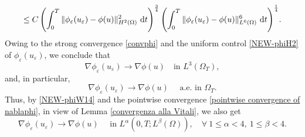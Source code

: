 \documentclass[11pt,  reqno]{amsart}%
\theoremstyle{plain}
\theoremstyle{definition}
\theoremstyle{remark}
\numberwithin{equation}{section}
\newcommand{\ve}{\varepsilon}
\newcommand{\dt}{\textup{d}t}
\begin{document}
\begin{itemize}
\begin{align*}
        \leq 
        C\left( \int_0^T\|\phi_\ve(u_\ve)-\phi(u)\|^{2}_{H^2(\Omega)}\ \dt\right)^{\frac34} 
        \left( \int_0^T\|\phi_\ve(u_\ve)-\phi(u)\|^{6}_{L^6(\Omega)}\ \dt\right)^{\frac14}\!.
    \end{align*}
  Owing to the strong convergence \eqref{convphi} and the uniform control \eqref{NEW-phiH2} of $\phi_\ve(u_\ve)$, we conclude that
    \begin{equation}
        \label{conv5}
        \nabla \phi_{\ve}(u_{\ve}) \to \nabla\phi(u) \quad \mbox{in } L^3(\Omega_T),
    \end{equation}
    and, in particular, 
    \begin{equation}
        \label{pointwise convergence of nablaphi}
        \nabla \phi_\ve(u_\ve) \to \nabla \phi(u) \quad \textrm{ a.e. in }\Omega_T.
    \end{equation}
    Thus, by \eqref{NEW-phiW14} and the pointwise convergence \eqref{pointwise convergence of nablaphi}, in view of Lemma \ref{convergenza alla Vitali}, we also get
    \begin{equation}
        \label{morefortegradphi}
        \nabla \phi_\ve(u_\ve) \to \nabla \phi(u) \quad \textrm{ in }L^\alpha(0,T;L^\beta(\Omega)), \quad \forall \ 1 \le \alpha<4, \ 1 \le \beta <4.
    \end{equation}
    

\end{itemize}
\end{document}
